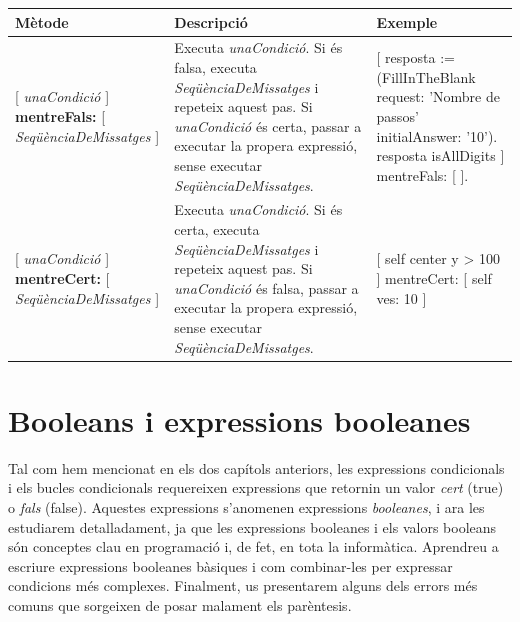 \vspace*{3mm}
\noindent
\begin{tabular}{p{42mm}p{47mm}p{47mm}}
\hline
\textbf{Mètode}  & \textbf{Descripció} & \textbf{Exemple} \\
\hline
{\footnotesize
\textsf{ [ {\itshape unaCondició} ] {\bfseries mentreFals:}}\newline
\hspace*{3mm} \textsf{[ {\itshape SeqüènciaDeMissatges} ]}
}
& 
{\footnotesize
Executa \textsf{\itshape unaCondició}. Si és falsa, executa \textsf{\itshape SeqüènciaDeMissatges} i repeteix aquest pas. \newline
Si \textsf{\itshape unaCondició} és certa, passar a executar la propera expressió, sense executar \textsf{\itshape SeqüènciaDeMissatges}.
}
&
\textsf{\footnotesize
[  resposta := (FillInTheBlank\newline
\hspace*{5mm} request: 'Nombre de passos'\newline
\hspace*{5mm} initialAnswer: '10').\newline
resposta isAllDigits  ] mentreFals: [ ].}
\\
{\footnotesize
\textsf{ [ {\itshape unaCondició} ] {\bfseries mentreCert:}}\newline
\hspace*{3mm} \textsf{[ {\itshape SeqüènciaDeMissatges} ]}}
& 
{\footnotesize
Executa \textsf{\itshape unaCondició}. Si és certa, executa \textsf{\itshape SeqüènciaDeMissatges} i repeteix aquest pas. \newline
Si \textsf{\itshape unaCondició} és falsa, passar a executar la propera expressió, sense executar \textsf{\itshape SeqüènciaDeMissatges}.}
&
\textsf{\footnotesize
[  self center y \textgreater \hspace*{1mm} 100  ]\newline
\hspace*{2mm} mentreCert: [  self ves: 10  ]}
\\
\hline 
\end{tabular}

\chapter{Booleans i expressions booleanes}
\label{cap20}

Tal com hem mencionat en els dos capítols anteriors, les expressions condicionals i els bucles condicionals requereixen expressions que retornin un valor \emph{cert} (\textsf{true}) o \emph{fals} (\textsf{false}). Aquestes expressions s'anomenen expressions \emph{booleanes}, i ara les estudiarem detalladament, ja que les expressions booleanes i els valors booleans són conceptes clau en programació i, de fet, en tota la informàtica. Aprendreu a escriure expressions booleanes bàsiques i com combinar-les per expressar condicions més complexes. Finalment, us presentarem alguns dels errors més comuns que sorgeixen de posar malament els parèntesis.

